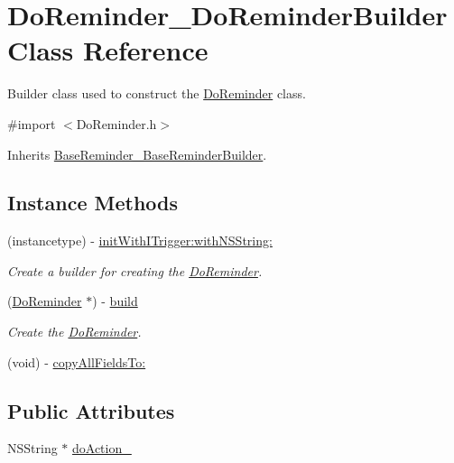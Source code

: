\hypertarget{interface_do_reminder___do_reminder_builder}{}\section{Do\+Reminder\+\_\+\+Do\+Reminder\+Builder Class Reference}
\label{interface_do_reminder___do_reminder_builder}


Builder class used to construct the \hyperlink{interface_do_reminder}{Do\+Reminder} class.  




{\ttfamily \#import $<$Do\+Reminder.\+h$>$}



Inherits \hyperlink{interface_base_reminder___base_reminder_builder}{Base\+Reminder\+\_\+\+Base\+Reminder\+Builder}.

\subsection*{Instance Methods}
\begin{DoxyCompactItemize}
\item 
(instancetype) -\/ \hyperlink{interface_do_reminder___do_reminder_builder_a9f5f8a2de1a789e4a083c2210b775964}{init\+With\+I\+Trigger\+:with\+N\+S\+String\+:}
\begin{DoxyCompactList}\small\item\em Create a builder for creating the \hyperlink{interface_do_reminder}{Do\+Reminder}. \end{DoxyCompactList}\item 
(\hyperlink{interface_do_reminder}{Do\+Reminder} $\ast$) -\/ \hyperlink{interface_do_reminder___do_reminder_builder_ad67fb523b418a30b4468ff6f9ec7363a}{build}
\begin{DoxyCompactList}\small\item\em Create the \hyperlink{interface_do_reminder}{Do\+Reminder}. \end{DoxyCompactList}\item 
(void) -\/ \hyperlink{interface_do_reminder___do_reminder_builder_a9ba6ab23f79609a65bcfa04872e28ec7}{copy\+All\+Fields\+To\+:}
\end{DoxyCompactItemize}
\subsection*{Public Attributes}
\begin{DoxyCompactItemize}
\item 
N\+S\+String $\ast$ \hyperlink{interface_do_reminder___do_reminder_builder_a83f0c6413bbed0c339911ff382e1578e}{do\+Action\+\_\+}
\end{DoxyCompactItemize}


